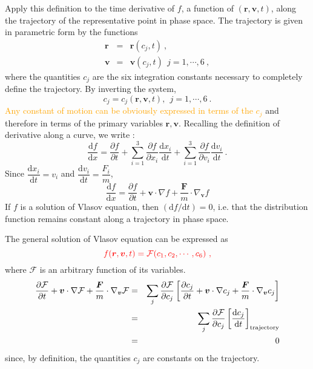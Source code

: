 \documentclass[12pt,a4paper]{article}
\renewcommand{\vec}[1]{\boldsymbol{#1}}
\newcommand{\dif}{\mathrm{d}}
\begin{document}
Apply this definition to the time derivative of $f$, a function of $(\vec{r}, \vec{v}, t)$, along the trajectory of the representative point in phase space. The trajectory is given in parametric form by the functions
\begin{eqnarray}
\nonumber \vec{r} &=& \vec{r}(c_j, t) ~, \\
\vec{v} &=& \vec{v}(c_j, t) ~~j = 1, \cdots, 6 ~,
\end{eqnarray}
where the quantities $c_j$ are the six integration constants necessary to completely define the trajectory. By inverting the system,
\begin{equation}
c_j = c_j (\vec{r}, \vec{v}, t), ~~j = 1, \cdots, 6 ~.
\end{equation}
\textcolor{orange}{Any constant of motion can be obviously expressed in terms of the $c_j$} and therefore in terms of the primary variables $\vec{r}, \vec{v}$. Recalling the definition of derivative along a curve, we write :
\begin{equation*}
\frac{\dif f}{\dif x}  = \frac{\partial f}{\partial t} + \sum_{i=1}^3 \frac{\partial f}{\partial x_i} \frac{\dif x_i}{\dif t} + \sum_{i=1}^3 \frac{\partial f}{\partial v_i} \frac{\dif v_i}{\dif t} ~.
\end{equation*}
Since $\dfrac{\dif x_i}{\dif t} = v_i$ and $\dfrac{\dif v_i}{\dif t} = \dfrac{F_i}{m}$,
\begin{equation*}
\frac{\dif f}{\dif x}  = \frac{\partial f}{\partial t} + \vec{v}\cdot \nabla f  + \frac{\vec{F}}{m}\cdot \nabla_{\vec{v}} f
\end{equation*}
If $f$ is a solution of Vlasov equation, then $(\dif f/\dif t) = 0$, i.e. that the distribution function remains constant along a trajectory in phase space.

The general solution of Vlasov equation can be expressed as
\begin{equation*}
\color{red} f(\vec{r}, \vec{v}, t) = \mathcal{F}(c_1, c_2, \cdots, c_6) ~,
\end{equation*}
where $\mathcal{F}$ is an arbitrary function of its variables. 
\begin{eqnarray*}
\frac{\partial \mathcal{F} }{\partial t} + \vec{v}\cdot \nabla \mathcal{F}  + \frac{\vec{F}}{m}\cdot \nabla_{\vec{v}} \mathcal{F} &=& \sum_j \frac{\partial \mathcal{F} }{\partial c_j} \left[\frac{\partial c_j }{\partial t} + \vec{v}\cdot \nabla c_j  + \frac{\vec{F}}{m}\cdot \nabla_{\vec{v}} c_j \right] \\
&=&  \sum_j \frac{\partial \mathcal{F} }{\partial c_j} \left[\frac{\dif c_j }{\dif t} \right]_{\rm trajectory} \\
&=& 0
\end{eqnarray*}
since, by definition, the quantities $c_j$ are constants on the trajectory.
\end{document}
